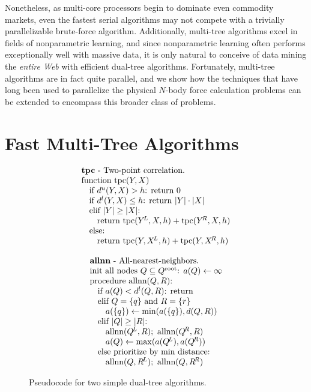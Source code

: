 \documentclass[times, leqno,twocolumn]{article}
\newcommand{\psty}{}
\newcommand{\X}{\\ \psty}
\newcommand{\x}{\X \hspace{0.13in}}
\newcommand{\xx}{\X \hspace{0.26in}}
\newcommand{\kdroot}[1]{#1^{\text{root}}}
\newcommand{\kdleft}[1]{#1^{\!L}}
\newcommand{\kdright}[1]{#1^{\!R}}
\newcommand{\lo}[1]{#1^{l}}
\newcommand{\up}[1]{#1^{u}}
\newcommand{\distlo}{\lo{d}}
\newcommand{\distup}{\up{d}}
\newcommand{\dist}[2]{d(#1,#2)}
\begin{document}
Nonetheless, as multi-core processors begin to dominate even commodity markets, even the fastest serial algorithms may not compete with a trivially parallelizable brute-force algorithm.
Additionally, multi-tree algorithms excel in fields of nonparametric learning, and since nonparametric learning often performs exceptionally well with massive data, it is only natural to conceive of data mining the {\it entire Web} with efficient dual-tree algorithms.
Fortunately, multi-tree algorithms are in fact quite parallel, and we show how the techniques that have long been used to parallelize the physical $N$-body force calculation problems can be extended to encompass this broader class of problems.

\section{Fast Multi-Tree Algorithms}

\begin{figure*}
  \begin{minipage}{6in}
    \begin{minipage}{2.5in}
      \begin{displaymath}
        \begin{array}[t]{l}
          \text{{\bf tpc} - Two-point correlation.}
          \X \text{function tpc}(Y, X)
          \x \text{if }\distup(Y, X) > h\text{: return }0
          \x \text{if }\distlo(Y, X) \leq h\text{: return } |Y| \cdot |X|
          \x \text{elif }|Y| \geq |X|\text{:}
          \xx \text{return tpc}(\kdleft{Y}, X, h) + \text{tpc}(\kdright{Y}, X, h)
          \x \text{else:}
          \xx \text{return tpc}(Y, \kdleft{X}, h) + \text{tpc}(Y, \kdright{X}, h)
        \end{array}
       \end{displaymath}
       \caption{\footnotesize \label{fig:allnntpc} Pseudocode for two simple dual-tree algorithms.}
      \end{minipage}
      \begin{minipage}{3.0in}
       \begin{displaymath}
        \begin{array}[t]{l}
          \text{{\bf allnn} - All-nearest-neighbors.}
          \X \text{init all nodes }Q \subseteq \kdroot{Q}\text{: }a(Q) \gets \infty
          \X \text{procedure allnn}(Q,R)\text{:}
          \x \text{if }a(Q) < \distlo(Q, R)\text{: return}
          \x \text{elif }Q = \{q\} \text{ and } R = \{r\}
          \xx a(\{q\}) \gets \min(a(\{q\}), \dist{Q}{R})
          \x \text{elif }|Q| \geq |R|\text{:}
          \xx \text{allnn}(\kdleft{Q}, R); \text{ allnn}(\kdright{Q}, R)
          \xx a(Q) \gets \max(a(\kdleft{Q}), a(\kdright{Q}))
          \x \text{else prioritize by min distance:}
          \xx \text{allnn}(Q, \kdleft{R}); \text{ allnn}(Q, \kdright{R})
        \end{array}
       \end{displaymath}
      \end{minipage}
  \end{minipage}
\end{figure*}
\end{document}
